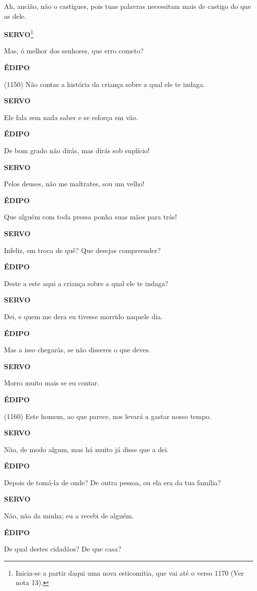 Ah, ancião, não o castigues, pois tuas palavras necessitam mais de
castigo do que as dele.

\textbf{SERVO}\footnote{Inicia-se a partir daqui uma nova esticomitia,
  que vai até o verso 1170 (Ver nota 13).}

Mas, ó melhor dos senhores, que erro cometo?

\textbf{ÉDIPO}

(1150) Não contas a história da criança sobre a qual ele te indaga.

\textbf{SERVO}

Ele fala sem nada saber e se esforça em vão.

\textbf{ÉDIPO}

De bom grado não dirás, mas dirás sob suplício!

\textbf{SERVO}

Pelos deuses, não me maltrates, sou um velho!

\textbf{ÉDIPO}

Que alguém com toda pressa ponha suas mãos para trás!

\textbf{SERVO}

Infeliz, em troca de quê? Que desejas compreender?

\textbf{ÉDIPO}

Deste a este aqui a criança sobre a qual ele te indaga?

\textbf{SERVO}

Dei, e quem me dera eu tivesse morrido naquele dia.

\textbf{ÉDIPO}

Mas a isso chegarás, se não disseres o que deves.

\textbf{SERVO}

Morro muito mais se eu contar.

\textbf{ÉDIPO}

(1160) Este homem, ao que parece, nos levará a gastar nosso tempo.

\textbf{SERVO}

Não, de modo algum, mas há muito já disse que a dei.

\textbf{ÉDIPO}

Depois de tomá-la de onde? De outra pessoa, ou ela era da tua família?

\textbf{SERVO}

Não, não da minha; eu a recebi de alguém.

\textbf{ÉDIPO}

De qual destes cidadãos? De que casa?

